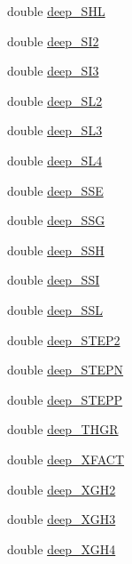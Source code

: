 \begin{DoxyCompactItemize}
\item 
double \hyperlink{structdeep__data_a4c54b8017a129fc3d10cd282cd5105e5}{deep\-\_\-\-S\-H\-L}
\item 
double \hyperlink{structdeep__data_a22e1fdb5f1e1b6893d23d466062115bc}{deep\-\_\-\-S\-I2}
\item 
double \hyperlink{structdeep__data_a15d41fc01e18e7f105695db6ac96ea45}{deep\-\_\-\-S\-I3}
\item 
double \hyperlink{structdeep__data_aafa3e6b122e44975ef5999af692723f6}{deep\-\_\-\-S\-L2}
\item 
double \hyperlink{structdeep__data_a78441198b323f7f43844112b75526f47}{deep\-\_\-\-S\-L3}
\item 
double \hyperlink{structdeep__data_ac601da064b22841b0ccd0464f454e0aa}{deep\-\_\-\-S\-L4}
\item 
double \hyperlink{structdeep__data_a257e06c1b69de9fe2acfc435107e6b74}{deep\-\_\-\-S\-S\-E}
\item 
double \hyperlink{structdeep__data_a6093e8f162d848d6611bf4acaeb1af52}{deep\-\_\-\-S\-S\-G}
\item 
double \hyperlink{structdeep__data_aedb85dc9534d5c4bc49a95f7986e23c9}{deep\-\_\-\-S\-S\-H}
\item 
double \hyperlink{structdeep__data_a7089f2ba95f129f977cdcc81f190a4e2}{deep\-\_\-\-S\-S\-I}
\item 
double \hyperlink{structdeep__data_abf490744760034dc2d45f92b0983ee9c}{deep\-\_\-\-S\-S\-L}
\item 
double \hyperlink{structdeep__data_aff58d59a2247bd4af80e400f20a63280}{deep\-\_\-\-S\-T\-E\-P2}
\item 
double \hyperlink{structdeep__data_ac218806a36921a793c6612d9ae5b8f01}{deep\-\_\-\-S\-T\-E\-P\-N}
\item 
double \hyperlink{structdeep__data_a2792396e57de1566cc7d90b63fc20e92}{deep\-\_\-\-S\-T\-E\-P\-P}
\item 
double \hyperlink{structdeep__data_a590b06dca7a36cf5722d3cde0f56f352}{deep\-\_\-\-T\-H\-G\-R}
\item 
double \hyperlink{structdeep__data_a7756727ac74db8449a85298662f5ddcf}{deep\-\_\-\-X\-F\-A\-C\-T}
\item 
double \hyperlink{structdeep__data_ab64dcff20022accb1f7afd53fbfa2aed}{deep\-\_\-\-X\-G\-H2}
\item 
double \hyperlink{structdeep__data_a20230a11ef99251c480aa16953da7928}{deep\-\_\-\-X\-G\-H3}
\item 
double \hyperlink{structdeep__data_a398fc0a0c832d17508fbb26e6710d3a4}{deep\-\_\-\-X\-G\-H4}

\end{DoxyCompactItemize}
